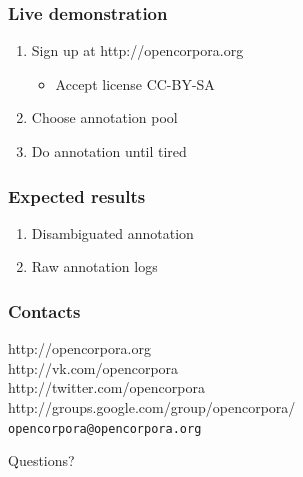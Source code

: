 \documentclass{beamer}
\begin{document}
\begin{frame}
\frametitle{Live demonstration}
\begin{enumerate}
\item{Sign up at http://opencorpora.org}
    \begin{itemize}
    \item{Accept license CC-BY-SA}
    \end{itemize}
\item{Choose annotation pool}
\item{Do annotation until tired}
\end{enumerate}
\end{frame}

\begin{frame}
\frametitle{Expected results}
\begin{enumerate}
\item{Disambiguated annotation}
\item{Raw annotation logs}
\end{enumerate}
\end{frame}


\begin{frame}
\frametitle{Contacts}
\begin{center}
\LARGE http://opencorpora.org\\[\bigskipamount]
\Large http://vk.com/opencorpora\\
\Large http://twitter.com/opencorpora\\
\Large http://groups.google.com/group/opencorpora/\\[\bigskipamount]
\Large\texttt{opencorpora@opencorpora.org}
\end{center}
\end{frame}

\begin{frame}
Questions?
\end{frame}
\end{document}
